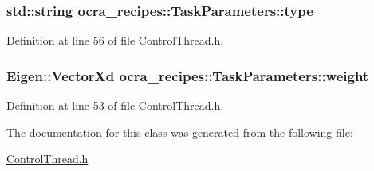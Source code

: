 \subsubsection[{\texorpdfstring{type}{type}}]{\setlength{\rightskip}{0pt plus 5cm}std\+::string ocra\+\_\+recipes\+::\+Task\+Parameters\+::type}\hypertarget{classocra__recipes_1_1TaskParameters_a8c62a820309b362ba4ce8c515a66aff4}{}\label{classocra__recipes_1_1TaskParameters_a8c62a820309b362ba4ce8c515a66aff4}


Definition at line 56 of file Control\+Thread.\+h.

\subsubsection[{\texorpdfstring{weight}{weight}}]{\setlength{\rightskip}{0pt plus 5cm}Eigen\+::\+Vector\+Xd ocra\+\_\+recipes\+::\+Task\+Parameters\+::weight}\hypertarget{classocra__recipes_1_1TaskParameters_aa960ee789e002d17f148a67cb8b35251}{}\label{classocra__recipes_1_1TaskParameters_aa960ee789e002d17f148a67cb8b35251}


Definition at line 53 of file Control\+Thread.\+h.



The documentation for this class was generated from the following file\+:\begin{DoxyCompactItemize}
\item 
\hyperlink{ControlThread_8h}{Control\+Thread.\+h}\end{DoxyCompactItemize}

